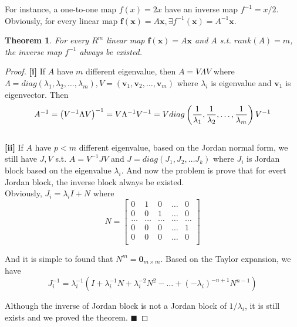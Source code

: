 \documentclass[12pt]{article}
\theoremstyle{plain}
\newtheorem{theorem}{\textbf{Theorem}}[section]
\newtheorem{proof}{\textit{PROOF}}[section]
\begin{document}
For instance, a one-to-one map $f(x) = 2x$ have an inverse map $f^{-1} = {x/2}$. Obviously, for every linear map $\mathbf f(\mathbf x) = A \mathbf x, \exists f^{-1}(\mathbf x) = A^{-1} \mathbf x$.

\begin{theorem} For every $R^m$ linear map $\mathbf f(\mathbf x) = A \mathbf x$ and $A$ s.t. $rank(A) = m$, the inverse map $f^{-1}$ always be existed.
\end{theorem}
{\color{blue}
\begin{proof}\textbf{[i]} If $A$ have $m$ different eigenvalue, then $A = V\Lambda V$ where $\Lambda = diag(\lambda_1, \lambda_2, \ldots, \lambda_m), V = (\mathbf v_1, \mathbf v_2, \ldots ,\mathbf v_m)$ where $\lambda_i$ is eigenvalue and $\mathbf v_1$ is eigenvector. Then 
$$
A^{-1} = \left(V^{-1} \Lambda V\right)^{-1} = V \Lambda^{-1} V^{-1} = V diag\left({1 \over \lambda_1}, {1 \over \lambda_2}, \ldots, {1 \over \lambda_m}\right) V^{-1}
$$
\\\noindent \textbf{[ii]} If $A$ have $p < m$ different eigenvalue, based on the Jordan normal form, we still have $J, V$ s.t. $A = V^{-1} J V$ and $J = diag(J_1, J_2, \ldots J_k)$ where $J_i$ is Jordan block based on the eigenvalue $\lambda_i$. And now the problem is prove that for evert Jordan block, the inverse block always be existed.
\\\noindent Obviously, $J_i = \lambda_i I + N$ where
$$
N = \left[
\begin{array}{ccccc}
0 & 1 & 0 & \ldots & 0 \\
0 & 0 & 1 & \ldots & 0 \\
\ldots & \ldots & \ldots & \ldots & \ldots \\
0 & 0 & 0 & \ldots & 1 \\
0 & 0 & 0 & \ldots & 0 \\
\end{array} \right]
$$

And it is simple to found that $N^m = \mathbf 0_{m\times m}$. Based on the Taylor expansion, we have 
$$
J_i^{-1} = \lambda_i^{-1} (I + \lambda_i^{-1} N + \lambda_i^{-2} N^2 - \ldots + (-\lambda_i)^{-n+1}N^{n-1})
$$

Although the inverse of Jordan block is not a Jordan block of $1/\lambda_i$, it is still exists and we proved the theorem. $\blacksquare$
\end{proof}
}
\end{document}
